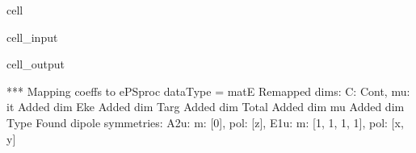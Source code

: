 \documentclass[letterpaper,table,10pt,english]{jupyterBook}
\begin{document}
\begin{sphinxuseclass}{cell}\begin{sphinxVerbatimInput}

\begin{sphinxuseclass}{cell_input}
\begin{sphinxVerbatim}[commandchars=\\\{\}]

   

  

  

\end{sphinxVerbatim}

\end{sphinxuseclass}\end{sphinxVerbatimInput}
\begin{sphinxVerbatimOutput}

\begin{sphinxuseclass}{cell_output}
\begin{sphinxVerbatim}[commandchars=\\\{\}]
*** Mapping coeffs to ePSproc dataType = matE
Remapped dims: \PYGZob{}\PYGZsq{}C\PYGZsq{}: \PYGZsq{}Cont\PYGZsq{}, \PYGZsq{}mu\PYGZsq{}: \PYGZsq{}it\PYGZsq{}\PYGZcb{}
Added dim Eke
Added dim Targ
Added dim Total
Added dim mu
Added dim Type
Found dipole symmetries: 
\PYGZob{}\PYGZsq{}A2u\PYGZsq{}: \PYGZob{}\PYGZsq{}m\PYGZsq{}: [0], \PYGZsq{}pol\PYGZsq{}: [\PYGZsq{}z\PYGZsq{}]\PYGZcb{}, \PYGZsq{}E1u\PYGZsq{}: \PYGZob{}\PYGZsq{}m\PYGZsq{}: [\PYGZhy{}1, 1, \PYGZhy{}1, 1], \PYGZsq{}pol\PYGZsq{}: [\PYGZsq{}x\PYGZsq{}, \PYGZsq{}y\PYGZsq{}]\PYGZcb{}\PYGZcb{}
\end{sphinxVerbatim}

\end{sphinxuseclass}\end{sphinxVerbatimOutput}

\end{sphinxuseclass}
\end{document}
